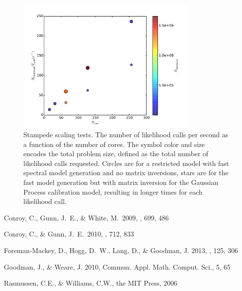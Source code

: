 \documentclass[11pt,preprint]{aastex}
\begin{document}
\begin{figure}
\begin{center}
\includegraphics[width=0.8\textwidth]{efficiency.pdf}
\caption{Stampede scaling tests. The number of likelihood calls per second as a function of the number of cores.  The symbol color and size encodes the total problem size, defined as the total number of likelihood calls requested.  Circles are for a restricted model with fast spectral model generation and no matrix inversions, stars are for the fast model generation but with matrix inversion for the Gaussian Process calibration model, resulting in longer times for each likelihood call. \label{fig:scaling}}
\end{center}
\end{figure}
\begin{thebibliography}

Conroy, C., Gunn, J.~E., \& White, M.\ 2009, \apj, 699, 486 

Conroy, C., \& Gunn, J.~E.\ 2010, \apj, 712, 833 

Foreman-Mackey, D., Hogg, D.~W., Lang, D., \& Goodman, J. 2013, \pasp, 125, 306 

Goodman, J., \& Weare,  J. 2010, Commun. Appl. Math. Comput. Sci., 5, 65

Rasmussen, C.E., \& Williams, C.W., the MIT Press, 2006

\end{thebibliography}
\end{document}

